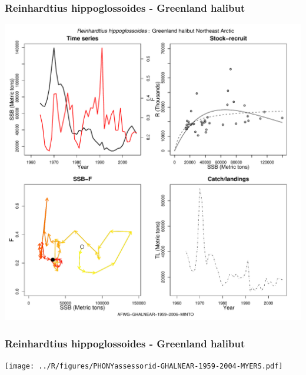\subsubsection{Reinhardtius hippoglossoides - Greenland halibut}
\begin{center}
\includegraphics[width=1.2\textwidth]{../R/figures/AFWG-GHALNEAR-1959-2006-MINTO.pdf}
\end{center}

\subsubsection{Reinhardtius hippoglossoides - Greenland halibut}
\begin{center}
\texttt{[image: ../R/figures/PHONYassessorid-GHALNEAR-1959-2004-MYERS.pdf]}
\end{center}

